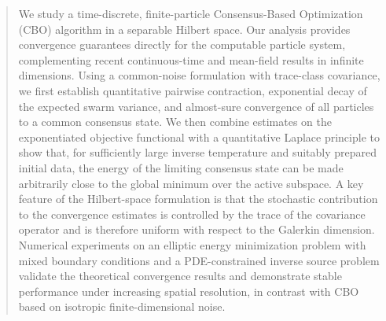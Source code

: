\documentclass[12pt]{amsart}
\numberwithin{equation}{section}
\begin{document}
\date{\today}

\begin{abstract}
We study a time-discrete, finite-particle Consensus-Based Optimization (CBO) algorithm in a separable Hilbert space. Our analysis provides convergence guarantees directly for the computable particle system, complementing recent continuous-time and mean-field results in infinite dimensions. Using a common-noise formulation with trace-class covariance, we first establish quantitative pairwise contraction, exponential decay of the expected swarm variance, and almost-sure convergence of all particles to a common consensus state. We then combine estimates on the exponentiated objective functional with a quantitative Laplace principle to show that, for sufficiently large inverse temperature and suitably prepared initial data, the energy of the limiting consensus state can be made arbitrarily close to the global minimum over the active subspace. A key feature of the Hilbert-space formulation is that the stochastic contribution to the convergence estimates is controlled by the trace of the covariance operator and is therefore uniform with respect to the Galerkin dimension. Numerical experiments on an elliptic energy minimization problem with mixed boundary conditions and a PDE-constrained inverse source problem validate the theoretical convergence results and demonstrate stable performance under increasing spatial resolution, in contrast with CBO based on isotropic finite-dimensional noise.
\end{abstract}









\end{document}
